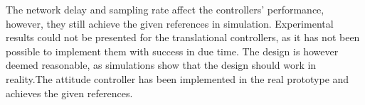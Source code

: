 The network delay and sampling rate affect the controllers' performance, however, they still achieve the given references in simulation. Experimental results could not be presented for the translational controllers, as it has not been possible to implement them with success in due time. The design is however deemed reasonable, as simulations show that the design should work in reality.The attitude controller has been implemented in the real prototype and achieves the given references. 
%
